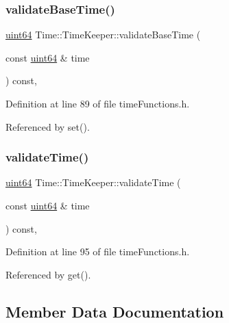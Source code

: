 \subsubsection{\texorpdfstring{validate\+Base\+Time()}{validateBaseTime()}}
{\footnotesize\ttfamily \hyperlink{systemDefines_8h_abc0f5bc07737e498f287334775dff2b6}{uint64} Time\+::\+Time\+Keeper\+::validate\+Base\+Time (\begin{DoxyParamCaption}\item[{const \hyperlink{systemDefines_8h_abc0f5bc07737e498f287334775dff2b6}{uint64} \&}]{time }\end{DoxyParamCaption}) const\hspace{0.3cm}{\ttfamily [inline]}, {\ttfamily [private]}}



Definition at line 89 of file time\+Functions.\+h.



Referenced by set().

\mbox{\label{classTime_1_1TimeKeeper_a83b58d0e6cbeae53fadf2b1cdf6dfa5d}} 
\subsubsection{\texorpdfstring{validate\+Time()}{validateTime()}}
{\footnotesize\ttfamily \hyperlink{systemDefines_8h_abc0f5bc07737e498f287334775dff2b6}{uint64} Time\+::\+Time\+Keeper\+::validate\+Time (\begin{DoxyParamCaption}\item[{const \hyperlink{systemDefines_8h_abc0f5bc07737e498f287334775dff2b6}{uint64} \&}]{time }\end{DoxyParamCaption}) const\hspace{0.3cm}{\ttfamily [inline]}, {\ttfamily [private]}}



Definition at line 95 of file time\+Functions.\+h.



Referenced by get().



\subsection{Member Data Documentation}
\mbox{\label{classTime_1_1TimeKeeper_ac464f5009a83136c7b864abf8aff0951}} 
